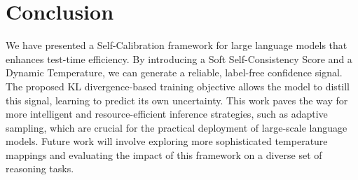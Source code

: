 \documentclass{article}
\begin{document}
\section{Conclusion}
We have presented a Self-Calibration framework for large language models that enhances test-time efficiency. By introducing a Soft Self-Consistency Score and a Dynamic Temperature, we can generate a reliable, label-free confidence signal. The proposed KL divergence-based training objective allows the model to distill this signal, learning to predict its own uncertainty. This work paves the way for more intelligent and resource-efficient inference strategies, such as adaptive sampling, which are crucial for the practical deployment of large-scale language models. Future work will involve exploring more sophisticated temperature mappings and evaluating the impact of this framework on a diverse set of reasoning tasks.



\end{document}
